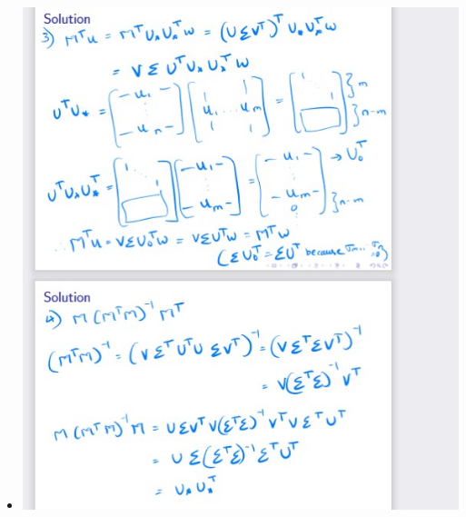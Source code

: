 \documentclass[12pt,twoside]{article}
\begin{document}
\begin{itemize}
\item \includegraphics[width=15cm]{final Review/lab 8 part 3 .jpg}
\end{itemize}
\end{document}
